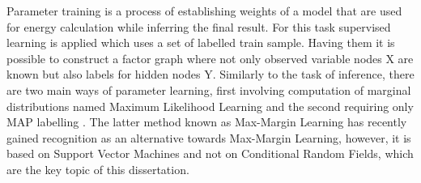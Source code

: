 Parameter training is a process of establishing weights of a model that are used for energy calculation while inferring the final result. For this task supervised learning is applied which uses a set of labelled train sample. Having them it is possible to construct a factor graph where not only observed variable nodes X are known but also labels for hidden nodes Y. Similarly to the task of inference, there are two main ways of parameter learning, first involving computation of marginal distributions named Maximum Likelihood Learning and the second requiring only MAP labelling \cite{markov_blake}. The latter method known as Max-Margin Learning has recently gained recognition as an alternative towards Max-Margin Learning, however, it is based on Support Vector Machines and not on Conditional Random Fields, which are the key topic of this dissertation. 

